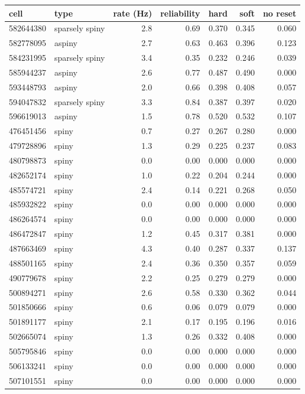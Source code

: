 \begin{tabular}{llrrrrr}
\toprule
cell & type & rate (Hz) & reliability & hard & soft & no reset\\
\midrule
582644380 & sparsely spiny & 2.8 & 0.69 & 0.370 & 0.345 & 0.060\\
582778095 & aspiny & 2.7 & 0.63 & 0.463 & 0.396 & 0.123\\
584231995 & sparsely spiny & 3.4 & 0.35 & 0.232 & 0.246 & 0.039\\
585944237 & aspiny & 2.6 & 0.77 & 0.487 & 0.490 & 0.000\\
593448793 & aspiny & 2.0 & 0.66 & 0.398 & 0.408 & 0.057\\
594047832 & sparsely spiny & 3.3 & 0.84 & 0.387 & 0.397 & 0.020\\
596619013 & aspiny & 1.5 & 0.78 & 0.520 & 0.532 & 0.107\\
476451456 & spiny & 0.7 & 0.27 & 0.267 & 0.280 & 0.000\\
479728896 & spiny & 1.3 & 0.29 & 0.225 & 0.237 & 0.083\\
480798873 & spiny & 0.0 & 0.00 & 0.000 & 0.000 & 0.000\\
482652174 & spiny & 1.0 & 0.22 & 0.204 & 0.244 & 0.000\\
485574721 & spiny & 2.4 & 0.14 & 0.221 & 0.268 & 0.050\\
485932822 & spiny & 0.0 & 0.00 & 0.000 & 0.000 & 0.000\\
486264574 & spiny & 0.0 & 0.00 & 0.000 & 0.000 & 0.000\\
486472847 & spiny & 1.2 & 0.45 & 0.317 & 0.381 & 0.000\\
487663469 & spiny & 4.3 & 0.40 & 0.287 & 0.337 & 0.137\\
488501165 & spiny & 2.4 & 0.36 & 0.350 & 0.357 & 0.059\\
490779678 & spiny & 2.2 & 0.25 & 0.279 & 0.279 & 0.000\\
500894271 & spiny & 2.6 & 0.58 & 0.330 & 0.362 & 0.044\\
501850666 & spiny & 0.6 & 0.06 & 0.079 & 0.079 & 0.000\\
501891177 & spiny & 2.1 & 0.17 & 0.195 & 0.196 & 0.016\\
502665074 & spiny & 1.3 & 0.26 & 0.332 & 0.408 & 0.000\\
505795846 & spiny & 0.0 & 0.00 & 0.000 & 0.000 & 0.000\\
506133241 & spiny & 0.0 & 0.00 & 0.000 & 0.000 & 0.000\\
507101551 & spiny & 0.0 & 0.00 & 0.000 & 0.000 & 0.000\\

\end{tabular}

